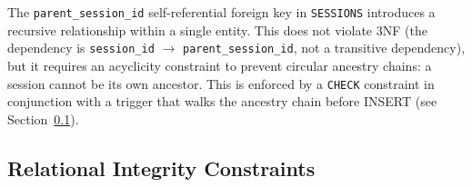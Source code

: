 \documentclass[12pt,a4paper]{report}
\begin{document}
\noindent The \texttt{parent\_session\_id} self-referential foreign key in
\texttt{SESSIONS} introduces a recursive relationship within a single entity.
This does not violate 3NF (the dependency is \texttt{session\_id} $\to$
\texttt{parent\_session\_id}, not a transitive dependency), but it requires an
acyclicity constraint to prevent circular ancestry chains: a session cannot be
its own ancestor. This is enforced by a \texttt{CHECK} constraint in conjunction
with a trigger that walks the ancestry chain before INSERT (see
Section~\ref{sec:integrity-constraints}).

\subsection{Relational Integrity Constraints}
\label{sec:integrity-constraints}
\end{document}
